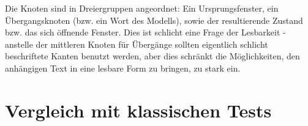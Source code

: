 Die Knoten sind in Dreiergruppen angeordnet: Ein Ursprungsfenster, ein Übergangsknoten
(bzw. ein Wort des Modells), sowie der resultierende Zustand bzw. das sich öffnende Fenster.
Dies ist schlicht eine Frage der Lesbarkeit - anstelle der mittleren Knoten für Übergänge sollten
eigentlich schlicht beschriftete Kanten benutzt werden, aber dies schränkt die Möglichkeiten,
den anhängigen Text in eine lesbare Form zu bringen, zu stark ein.


\section{Vergleich mit klassischen Tests}\label{section:testcomparisonclassic}

